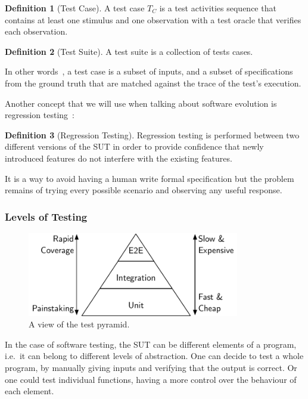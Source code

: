 \documentclass[a4paper,11pt]{sdm_internship}
\theoremstyle{definition}
\newtheorem{definition}{Definition}[section]
\begin{document}
\begin{definition}[Test Case]
  A test case $T_C$ is a test activities sequence that contains at least one stimulus and one observation with a test oracle that verifies each observation.
\end{definition}
\begin{definition}[Test Suite]
  A test suite is a collection of tests cases.
\end{definition}

In other words~\cite{bernot1991software}, a test case is a subset of inputs, and a subset of specifications from the ground truth that are matched against the trace of the test's execution.

Another concept that we will use when talking about software evolution is regression testing~\cite{yoo2012regression}:

\begin{definition}[Regression Testing]
  Regression testing is performed between two different versions of the SUT in order to provide confidence that newly introduced features do not interfere with the existing features.
\end{definition}

It is a way to avoid having a human write formal specification but the problem remains of trying every possible scenario and observing any useful response.

\subsubsection{Levels of Testing}%
\label{sssec:levels_testing}
\begin{figure}
  \centering
  \includegraphics[width=25em]{test_pyramid}
  \caption{A view of the test pyramid.}%
  \label{fig:test_pyramid}
\end{figure}

In the case of software testing, the SUT can be different elements of a program, i.e.\ it can belong to different levels of abstraction.
One can decide to test a whole program, by manually giving inputs and verifying that the output is correct.
Or one could test individual functions, having a more control over the behaviour of each element.
\end{document}
